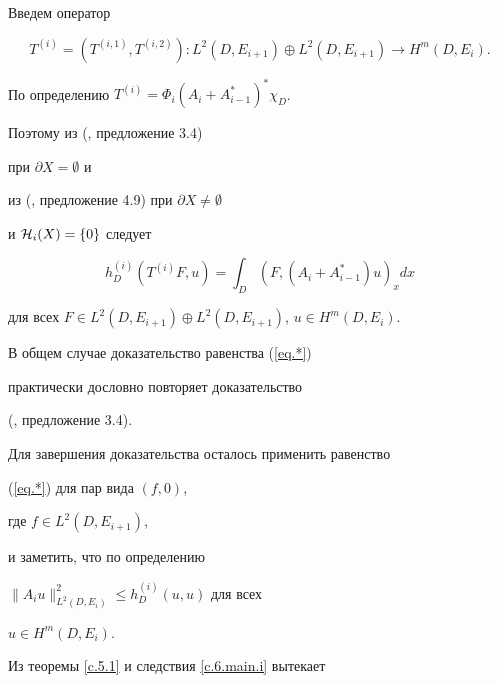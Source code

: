 \begin{pf}


Введем оператор


$$


T^{(i)}= (T^{(i,1)}, T^{(i,2)}):


L^2 (D, E_{i+1}) \oplus L^2 (D, E_{i+1}) \to H^m (D, E_i).


$$


По определению $T^{(i)}=\Phi_i(A_i+A^*_{i-1})^* \chi_D $. 


Поэтому из (\cite{Sh17}, предложение 3.4)


при $\partial X=\emptyset$  и


из (\cite{NaSh}, предложение 4.9) при $\partial X \ne \emptyset$


и ${\cal H}_i (X)=\{ 0\}$ следует


\begin{equation} \label{eq.*}


h^{(i)}_{D}(T^{(i)} F, u)


= \int_D (F,(A_i+A^*_{i-1}) u)_x dx


\end{equation}


для всех $F \in L^2 (D, E_{i+1}) \oplus


L^2 (D, E_{i+1})$, $u \in H^{m} (D,E_i)$.


В общем случае доказательство равенства (\ref{eq.*})


практически дословно повторяет доказательство


(\cite{Sh17}, предложение 3.4).





Для завершения доказательства осталось применить равенство


(\ref{eq.*}) для пар вида $(f,0)$,


где $f \in L^{2} (D, E_{i+1})$,


и заметить, что по определению


$\| A_i u \|^2_{L^2 (D,E_i)} \leq h_D^{(i)} (u,u)$ для всех


$u \in H^{m} (D, E_i)$.


\end{pf}





Из теоремы \ref{c.5.1} и следствия \ref{c.6.main.i} вытекает








